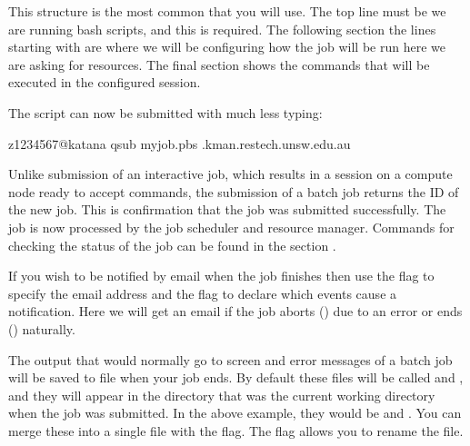 \documentclass[letterpaper,10pt,english]{sphinxmanual}
\begin{document}
This structure is the most common that you will use. The top line must be  \sphinxhyphen{} we are running bash scripts, and this is required.
The following section \sphinxhyphen{} the lines starting with  \sphinxhyphen{} are where we will be configuring how the job will be run \sphinxhyphen{} here we are asking for resources.
The final section shows the commands that will be executed in the configured session.

The script can now be submitted with much less typing:

\begin{sphinxVerbatim}[commandchars=\\\{\}]
\PYG{o}{[}z1234567@katana \PYGZti{}\PYG{o}{]}\PYGZdl{} qsub myjob.pbs
.kman.restech.unsw.edu.au
\end{sphinxVerbatim}

Unlike submission of an interactive job, which results in a session on a compute node ready to accept commands, the submission of a batch job returns the ID of the new job. This is confirmation that the job was submitted successfully. The job is now processed by the job scheduler and resource manager. Commands for checking the status of the job can be found in the section {\hyperref[\detokenize{using_katana/running_jobs:managing-jobs-on-katana}]{}}.

If you wish to be notified by email when the job finishes then use the  flag to specify the email address and the  flag to declare which events cause a notification. Here we will get an email if the job aborts () due to an error or ends () naturally.

\begin{sphinxVerbatim}[commandchars=\\\{\}]
\end{sphinxVerbatim}

The output that would normally go to screen and error messages of a batch job will be saved to file when your job ends. By default these files will be called  and , and they will appear in the directory that was the current working directory when the job was submitted. In the above example, they would be  and .  You can merge these into a single file with the  flag. The  flag allows you to rename the file.
\end{document}
